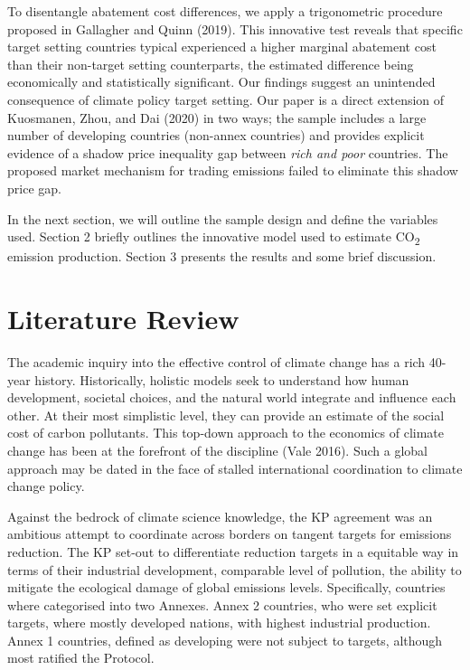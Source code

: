 \documentclass[
  10pt,
]{article}
\begin{document}
To disentangle abatement cost differences, we apply a trigonometric
procedure proposed in Gallagher and Quinn (2019). This innovative test
reveals that specific target setting countries typical experienced a
higher marginal abatement cost than their non-target setting
counterparts, the estimated difference being economically and
statistically significant. Our findings suggest an unintended
consequence of climate policy target setting. Our paper is a direct
extension of Kuosmanen, Zhou, and Dai (2020) in two ways; the sample
includes a large number of developing countries (non-annex countries)
and provides explicit evidence of a shadow price inequality gap between
\emph{rich and poor} countries. The proposed market mechanism for
trading emissions failed to eliminate this shadow price gap.

In the next section, we will outline the sample design and define the
variables used. Section 2 briefly outlines the innovative model used to
estimate CO\textsubscript{2} emission production. Section 3 presents the
results and some brief discussion.

\hypertarget{literature-review}{%
\section{Literature Review}\label{literature-review}}

The academic inquiry into the effective control of climate change has a
rich 40-year history. Historically, holistic models seek to understand
how human development, societal choices, and the natural world integrate
and influence each other. At their most simplistic level, they can provide an
estimate of the social cost of carbon pollutants. This top-down approach
to the economics of climate change has been at the forefront of the
discipline (Vale 2016). Such a global approach may be dated in the face
of stalled international coordination to climate change policy.

Against the bedrock of climate science knowledge, the KP agreement was an ambitious attempt to coordinate across borders on tangent targets for emissions reduction. The KP set-out to differentiate reduction targets in a equitable way in terms of their industrial development, comparable level of pollution, the ability to mitigate the ecological damage of global emissions levels. Specifically, countries where categorised into two Annexes.  Annex 2 countries, who were set explicit targets, where mostly developed nations, with highest industrial production. Annex 1 countries, defined as developing
were not subject to targets, although most ratified the
Protocol.
\end{document}
